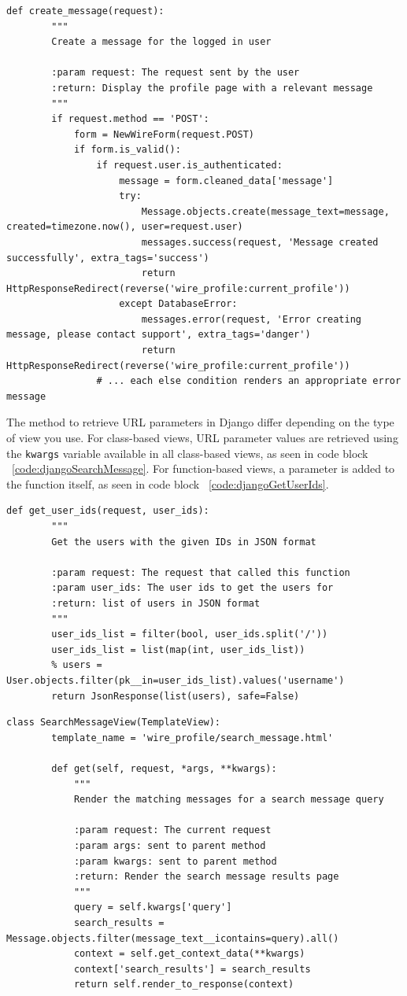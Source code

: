 \begin{lstlisting}[caption={Function-based create message view},label={code:djangoCreateMessageView}]
	def create_message(request):
		"""
		Create a message for the logged in user

		:param request: The request sent by the user
		:return: Display the profile page with a relevant message
		"""
		if request.method == 'POST':
			form = NewWireForm(request.POST)
			if form.is_valid():
				if request.user.is_authenticated:
					message = form.cleaned_data['message']
					try:
						Message.objects.create(message_text=message, created=timezone.now(), user=request.user)
						messages.success(request, 'Message created successfully', extra_tags='success')
						return HttpResponseRedirect(reverse('wire_profile:current_profile'))
					except DatabaseError:
						messages.error(request, 'Error creating message, please contact support', extra_tags='danger')
						return HttpResponseRedirect(reverse('wire_profile:current_profile'))
				# ... each else condition renders an appropriate error message
\end{lstlisting}

The method to retrieve URL parameters in Django differ depending on the type
of view you use. For class-based views, URL parameter values are retrieved using
the \texttt{kwargs} variable available in all class-based views, as seen in
code block ~\ref{code:djangoSearchMessage}. For function-based views, a
parameter is added to the function itself, as seen in code block ~\ref{code:djangoGetUserIds}. 

\begin{lstlisting}[caption={Function-based view for returning user data},label={code:djangoGetUserIds}]
	def get_user_ids(request, user_ids):
		"""
		Get the users with the given IDs in JSON format

		:param request: The request that called this function
		:param user_ids: The user ids to get the users for
		:return: list of users in JSON format
		"""
		user_ids_list = filter(bool, user_ids.split('/'))
		user_ids_list = list(map(int, user_ids_list))
		% users = User.objects.filter(pk__in=user_ids_list).values('username')
		return JsonResponse(list(users), safe=False)
\end{lstlisting}

\begin{lstlisting}[caption={Class-based view to search for a given message},label={code:djangoSearchMessage}]
	class SearchMessageView(TemplateView):
		template_name = 'wire_profile/search_message.html'

		def get(self, request, *args, **kwargs):
			"""
			Render the matching messages for a search message query

			:param request: The current request
			:param args: sent to parent method
			:param kwargs: sent to parent method
			:return: Render the search message results page
			"""
			query = self.kwargs['query']
			search_results = Message.objects.filter(message_text__icontains=query).all()
			context = self.get_context_data(**kwargs)
			context['search_results'] = search_results
			return self.render_to_response(context)
\end{lstlisting}

